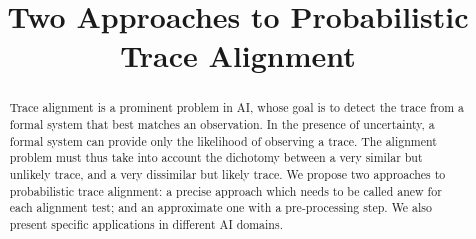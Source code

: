 \documentclass{article}
\title{Two Approaches to Probabilistic Trace Alignment}
\date{\vspace{-5em}}
\begin{document}
\maketitle

\begin{abstract}
Trace alignment is a prominent problem in AI, whose goal is to detect the trace from a formal 
system that best matches an observation. In the presence of uncertainty, a
formal system can provide only the likelihood of observing a trace. The alignment problem must thus take into account 
the dichotomy between a very similar but unlikely trace, and a very
dissimilar but likely trace. We propose two approaches to probabilistic trace alignment: a precise approach which
needs to be called anew for each alignment test; and an approximate one with a pre-processing step. We also present
specific applications in different AI domains.
\end{abstract}











\clearpage



\end{document}
